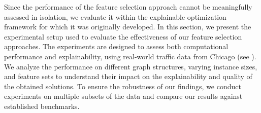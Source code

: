 \documentclass[11pt, a4paper]{article}
\begin{document}
Since the performance of the feature selection approach cannot be meaningfully assessed in isolation, we evaluate it within the explainable optimization framework for which it was originally developed.
In this section, we present the experimental setup used to evaluate the effectiveness of our feature selection approaches. The experiments are designed to assess both computational performance and explainability, using real-world traffic data from Chicago (see \cite{chassein2019algorithms,zenodo_chicago_data}). We analyze the performance on different graph structures, varying instance sizes, and feature sets to understand their impact on the explainability and quality of the obtained solutions. To ensure the robustness of our findings, we conduct experiments on multiple subsets of the data and compare our results against established benchmarks.
\end{document}
